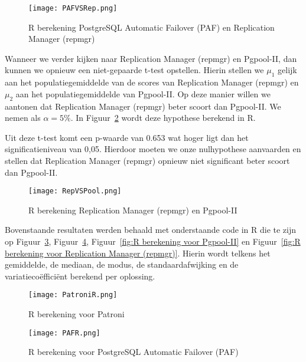 \begin{figure}[!h]
    \centering
    \texttt{[image: PAFVSRep.png]}
    \caption{R berekening PostgreSQL Automatic Failover (PAF) en Replication Manager (repmgr)}
    \label{fig:R berekening PostgreSQL Automatic Failover (PAF) en Replication Manager (repmgr)}
\end{figure}

Wanneer we verder kijken naar Replication Manager (repmgr) en Pgpool-II, dan kunnen we opnieuw een niet-gepaarde t-test opstellen. Hierin stellen we $\mu_1$ gelijk aan het populatiegemiddelde van de scores van Replication Manager (repmgr) en $\mu_2$ aan het populatiegemiddelde van Pgpool-II. Op deze manier willen we aantonen dat Replication Manager (repmgr) beter scoort dan Pgpool-II. We nemen als $\alpha = 5\%$. In Figuur~\ref{fig:R berekening Replication Manager (repmgr) en Pgpool-II} wordt deze hypothese berekend in R.

Uit deze t-test komt een p-waarde van 0.653 wat hoger ligt dan het significatieniveau van 0,05. Hierdoor moeten we onze nulhypothese aanvaarden en stellen dat Replication Manager (repmgr) opnieuw niet significant beter scoort dan Pgpool-II.

\begin{figure}[!h]
    \centering
    \texttt{[image: RepVSPool.png]}
    \caption{R berekening Replication Manager (repmgr) en Pgpool-II}
    \label{fig:R berekening Replication Manager (repmgr) en Pgpool-II}
\end{figure}


Bovenstaande resultaten werden behaald met onderstaande code in R die te zijn op Figuur~\ref{fig:R berekening voor Patroni}, Figuur~\ref{fig:R berekening voor PostgreSQL Automatic Failover (PAF)}, Figuur~\ref{fig:R berekening voor Pgpool-II} en Figuur~\ref{fig:R berekening voor Replication Manager (repmgr)}. Hierin wordt telkens het gemiddelde, de mediaan, de modus, de standaardafwijking en de variatiecoëfficiënt berekend per oplossing.

\begin{figure}[!h]
    \centering
    \texttt{[image: PatroniR.png]}
    \caption{R berekening voor Patroni}
    \label{fig:R berekening voor Patroni}
\end{figure}

\begin{figure}[!h]
    \centering
    \texttt{[image: PAFR.png]}
    \caption{R berekening voor PostgreSQL Automatic Failover (PAF)}
    \label{fig:R berekening voor PostgreSQL Automatic Failover (PAF)}
\end{figure}

